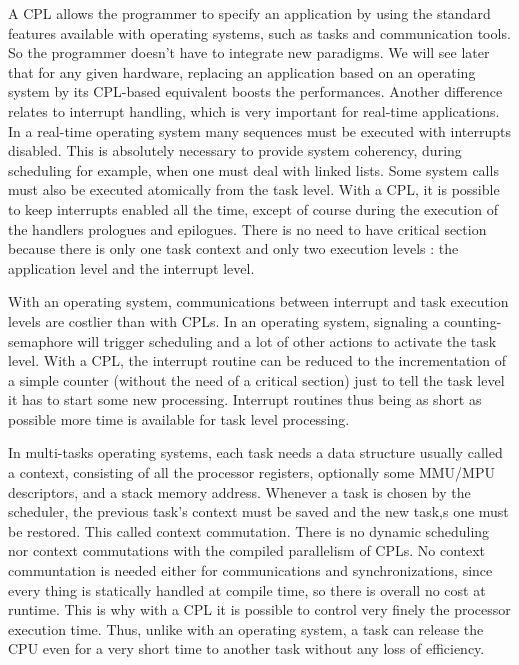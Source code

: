 \documentclass[10pt]{report}
\begin{document}
A CPL allows the programmer to specify an application by using the standard features available with operating systems, such as tasks
and communication tools. So the programmer doesn't have to integrate new paradigms. We will see later that for any given hardware, 
replacing an application based on an operating system by its CPL-based equivalent boosts the performances. Another difference
relates to interrupt handling, which is very important for real-time applications. In a real-time operating system many sequences 
must be executed with interrupts disabled. This is absolutely necessary to provide system coherency, during scheduling for example, 
when one must deal with linked lists. Some system calls must also be executed atomically from the task level. With a CPL, it is possible 
to keep interrupts enabled all the time, except of course during the execution of the handlers prologues and epilogues. There is no need 
to have critical section because there is only one task context and only two execution levels : the application level 
and the interrupt level.

With an operating system, communications between interrupt and task execution levels are costlier than with CPLs. In an operating system, 
signaling a counting-semaphore will trigger scheduling and a lot of other actions to activate the task level. With a CPL, the interrupt routine 
can be reduced to the incrementation of a simple counter (without the need of a critical section) just to tell the task level it has to start 
some new processing. Interrupt routines thus being as short as possible more time is available for task level processing.

In multi-tasks operating systems, each task needs a data structure usually called a context, consisting of all the processor
registers, optionally some MMU/MPU descriptors, and a stack memory address. Whenever a task is chosen by the scheduler, the previous
task's context must be saved and the new task,s one must be restored. This called context commutation. There is no dynamic scheduling 
nor context commutations with the compiled parallelism of CPLs. No context communtation is needed either for communications and synchronizations, 
since every thing is statically handled at compile time, so there is overall no cost at runtime. This is why with a CPL it is possible to control 
very finely the processor execution time. Thus, unlike with an operating system, a task can release the CPU even for a very short time to another 
task without any loss of efficiency.
\end{document}
